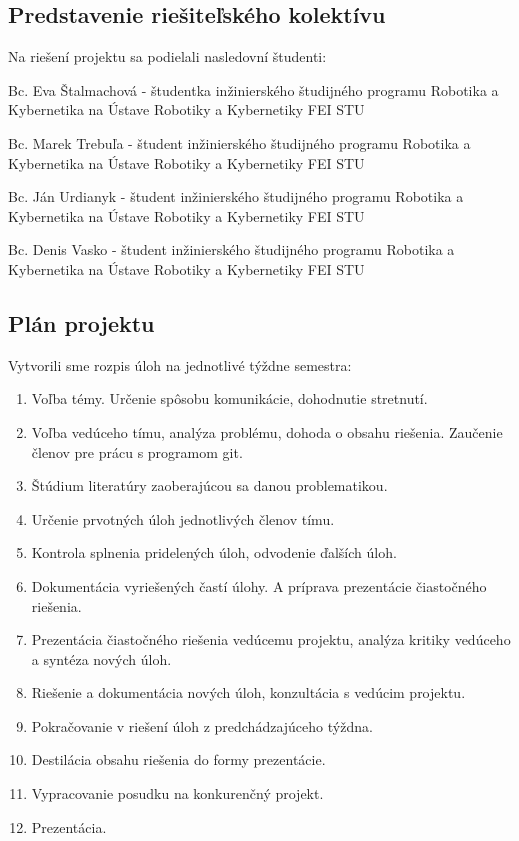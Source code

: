 \documentclass[../main.tex]{subfiles}
\begin{document}
    \subsection{Predstavenie riešiteľského kolektívu}   
    Na riešení projektu sa podielali nasledovní študenti:

        Bc. Eva Štalmachová - študentka inžinierského študijného programu Robotika a Kybernetika na Ústave Robotiky a Kybernetiky FEI STU

        Bc. Marek Trebuľa - študent inžinierského študijného programu Robotika a Kybernetika na Ústave Robotiky a Kybernetiky FEI STU

        Bc. Ján Urdianyk - študent inžinierského študijného programu Robotika a Kybernetika na Ústave Robotiky a Kybernetiky FEI STU

        Bc. Denis Vasko - študent inžinierského študijného programu Robotika a Kybernetika na Ústave Robotiky a Kybernetiky FEI STU

    \subsection{Plán projektu}   
    Vytvorili sme rozpis úloh na jednotlivé týždne semestra:
    \begin{enumerate}
    	\item Voľba témy. Určenie spôsobu komunikácie, dohodnutie stretnutí. 
    	\item Voľba vedúceho tímu, analýza problému, dohoda o obsahu riešenia. Zaučenie členov pre prácu s programom git. 
    	\item Štúdium literatúry zaoberajúcou sa danou problematikou.
    	\item Určenie prvotných úloh jednotlivých členov tímu.
    	\item Kontrola splnenia pridelených úloh, odvodenie ďalších úloh.
    	\item Dokumentácia vyriešených častí úlohy. A príprava prezentácie čiastočného riešenia.
    	\item Prezentácia čiastočného riešenia vedúcemu projektu, analýza kritiky vedúceho a syntéza nových úloh. 
    	\item Riešenie a dokumentácia nových úloh, konzultácia s vedúcim projektu.
    	\item Pokračovanie v riešení úloh z predchádzajúceho týždna.
    	\item Destilácia obsahu riešenia do formy prezentácie.
    	\item Vypracovanie posudku na konkurenčný projekt.
    	\item Prezentácia.
    \end{enumerate}
\end{document}
